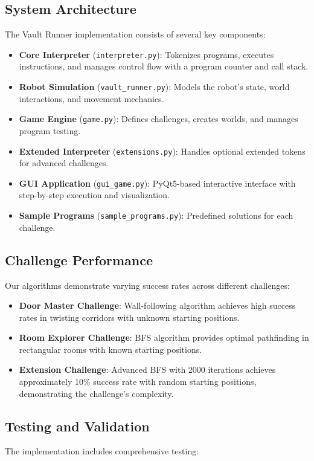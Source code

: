 \documentclass[11pt,a4paper]{article}
\begin{document}
\subsection{System Architecture}
The Vault Runner implementation consists of several key components:

\begin{itemize}[noitemsep]
  \item \textbf{Core Interpreter} (\texttt{interpreter.py}): Tokenizes programs, executes instructions, and manages control flow with a program counter and call stack.
  \item \textbf{Robot Simulation} (\texttt{vault\_runner.py}): Models the robot's state, world interactions, and movement mechanics.
  \item \textbf{Game Engine} (\texttt{game.py}): Defines challenges, creates worlds, and manages program testing.
  \item \textbf{Extended Interpreter} (\texttt{extensions.py}): Handles optional extended tokens for advanced challenges.
  \item \textbf{GUI Application} (\texttt{gui\_game.py}): PyQt5-based interactive interface with step-by-step execution and visualization.
  \item \textbf{Sample Programs} (\texttt{sample\_programs.py}): Predefined solutions for each challenge.
\end{itemize}

\subsection{Challenge Performance}
Our algorithms demonstrate varying success rates across different challenges:

\begin{itemize}[noitemsep]
  \item \textbf{Door Master Challenge}: Wall-following algorithm achieves high success rates in twisting corridors with unknown starting positions.
  \item \textbf{Room Explorer Challenge}: BFS algorithm provides optimal pathfinding in rectangular rooms with known starting positions.
  \item \textbf{Extension Challenge}: Advanced BFS with 2000 iterations achieves approximately 10\% success rate with random starting positions, demonstrating the challenge's complexity.
\end{itemize}

\subsection{Testing and Validation}
The implementation includes comprehensive testing:
\end{document}
